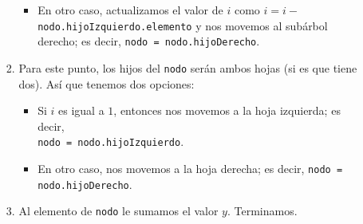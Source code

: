 \documentclass[letterpaper,11pt]{article}
\begin{document}
\begin{enumerate}
\begin{itemize}
\begin{enumerate}
\begin{itemize}
                \item En otro caso, actualizamos el valor de $i$ como 
                $i = i -$ \texttt{nodo.hijoIzquierdo.elemento} y nos movemos 
                al subárbol derecho; es decir, \texttt{nodo = nodo.hijoDerecho}.
            \end{itemize}

            \item Para este punto, los hijos del \texttt{nodo} serán ambos 
            hojas (si es que tiene dos). Así que tenemos dos opciones:
            \begin{itemize}
                \item Si $i$ es igual a $1$, entonces nos movemos a la 
                hoja izquierda; es decir, \\ 
                \texttt{nodo = nodo.hijoIzquierdo}.

                \item En otro caso, nos movemos a la hoja derecha; es decir, 
                \texttt{nodo = nodo.hijoDerecho}.
            \end{itemize}

            \item Al elemento de \texttt{nodo} le sumamos el valor $y$. 
            Terminamos. 
        \end{enumerate}


\end{itemize}
\end{enumerate}
\end{document}
